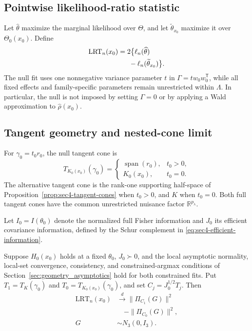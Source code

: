 \subsection{Pointwise likelihood-ratio statistic}
\label{subsec:pointwise_lrt}

Let $\widehat\theta$ maximize the marginal likelihood over
$\Theta$, and let $\widetilde\theta_{x_0}$ maximize it over
$\Theta_0(x_0)$. Define
\begin{equation}\label{eq:sec6-lrt}
\begin{aligned}
\mathrm{LRT}_n(x_0)
&=2\bigl\{\ell_n(\widehat\theta)\\
&\hspace{1.6em}
-\ell_n(\widetilde\theta_{x_0})\bigr\}.
\end{aligned}
\end{equation}
The null fit uses one nonnegative variance parameter $t$
in $\Gamma=t w_0w_0^{\mathsf T}$, while all fixed effects
and family-specific parameters remain unrestricted within
$\Lambda$. In particular, the null is not imposed by setting
$\Gamma=0$ or by applying a Wald approximation to
$\widehat\rho(x_0)$.

\subsection{Tangent geometry and nested-cone limit}
\label{subsec:pointwise_tangent}

For $\gamma_0=t_0r_0$, the null tangent cone is
\begin{equation}\label{eq:sec6-null-tangent}
T_{K_0(x_0)}(\gamma_0)=
\begin{cases}
\operatorname{span}(r_0),&t_0>0,\\
K_0(x_0),&t_0=0.
\end{cases}
\end{equation}
The alternative tangent cone is the rank-one supporting
half-space of
Proposition~\ref{prop:sec4-tangent-cones}
when $t_0>0$, and $K$ when $t_0=0$.
Both full tangent cones have the common unrestricted
nuisance factor $\mathbb R^{p_\lambda}$.

Let $I_0=I(\theta_0)$ denote the normalized full Fisher
information and $J_0$ its efficient covariance
information, defined by the Schur complement in
\eqref{eq:sec4-efficient-information}.

\begin{theorem}\label{thm:sec6-nested-cones}
Suppose $H_0(x_0)$ holds at a fixed $\theta_0$,
$J_0\succ0$, and the local asymptotic normality,
local-set convergence, consistency, and constrained-argmax
conditions of Section~\ref{sec:geometry_asymptotics}
hold for both constrained fits.
Put $T_1=T_K(\gamma_0)$ and
$T_0=T_{K_0(x_0)}(\gamma_0)$, and set
$C_j=J_0^{1/2}T_j$. Then
\begin{equation}\label{eq:sec6-projection-limit}
\begin{aligned}
\mathrm{LRT}_n(x_0)
&\xrightarrow{d}
\|\Pi_{C_1}(G)\|^2\\
&\quad-\|\Pi_{C_0}(G)\|^2,\\
G&\sim N_3(0,I_3).
\end{aligned}
\end{equation}
\end{theorem}

